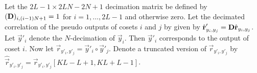 \documentclass[a4paper, openany, oneside]{memoir}
\begin{document}
Let the $2L-1\times 2LN-2N+1$ decimation matrix be defined by $(\boldsymbol{\mathbf{D}})_{i,(i-1)N+1} = 1$ for $i=1,\ldots,2L-1$ and otherwise zero. Let the decimated correlation of the pseudo outputs of cosets $i$ and $j$ by given by $\hat{\boldsymbol{\mathbf{r}}}'_{y_i,y_j} = \boldsymbol{\mathbf{D}} \hat{\boldsymbol{\mathbf{r}}}_{y_i,y_j}$.
Let $\vec{y}'_i$ denote the $N$-decimation of $\vec{y}_i$. Then $\vec{y}'_i$ corresponds to the output of coset $i$. Now let $\vec{r}_{y'_i,y'_j} = \vec{y}'_i \circ \vec{y}'_j$. Denote a truncated version of $\vec{r}_{y'_i,y'_j}$ by $\hat{\vec{r}}_{y'_i,y'_j}=\vec{r}_{y'_i,y'_j}[KL-L+1,KL+L-1]$.
\end{document}
